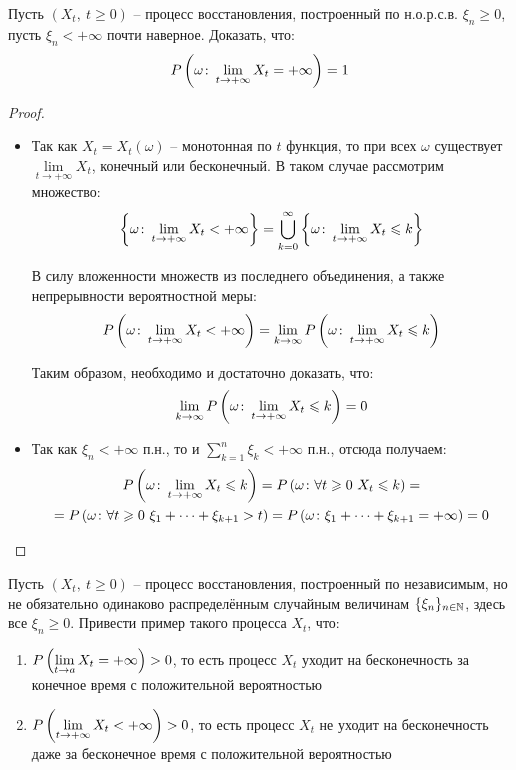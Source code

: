 \begin{problem}
    Пусть $(X_t,\ t \ge 0)$ -- процесс восстановления, построенный по н.о.р.с.в. $\xi_n \ge 0$, пусть $\xi_n < +\infty$ почти наверное. Доказать, что:
    \[
        P\left(\omega \colon \lim_{t \to +\infty} X_t = +\infty\right) = 1
    \]
\end{problem}

\begin{proof}~
    \begin{itemize}
        \item Так как $X_t = X_t(\omega)$ -- монотонная по $t$ функция, то при всех $\omega$ существует $\lim\limits_{t \to +\infty} X_t$, конечный или бесконечный. В таком случае рассмотрим множество:
        \[
            \left\{\omega \colon \lim_{t \to +\infty} X_t < +\infty\right\} = \bigcup_{k=0}^\infty \left\{\omega \colon \lim_{t \to +\infty} X_t \leqslant k\right\}
        \]

        В силу вложенности множеств из последнего объединения, а также непрерывности вероятностной меры:
        \[
            P\left(\omega \colon \lim_{t \to +\infty} X_t < +\infty\right) = \lim_{k \to \infty} P\left(\omega \colon \lim_{t \to +\infty} X_t \leqslant k\right) 
        \]

        Таким образом, необходимо и достаточно доказать, что:
        \[
            \lim_{k \to \infty} P\left(\omega \colon \lim_{t \to +\infty} X_t \leqslant k\right) = 0
        \]

        \item Так как $\xi_n < +\infty$ п.н., то и $\sum\limits_{k=1}^n \xi_k < +\infty$ п.н., отсюда получаем:
        \begin{multline*}
            P\left(\omega \colon \lim_{t \to +\infty} X_t \leqslant k\right) = P\left(\omega \colon \forall t \geqslant 0 \ X_t \leqslant k\right) =
            \\
            = P\left(\omega \colon \forall t \geqslant 0 \ \xi_1 + \dots + \xi_{k+1} > t\right) = P\left(\omega \colon \xi_1 + \dots + \xi_{k+1} = +\infty\right) = 0
        \end{multline*}
    \end{itemize}
\end{proof}

\begin{problem}
    Пусть $(X_t,\ t \ge 0)$ -- процесс восстановления, построенный по независимым, но не обязательно одинаково распределённым случайным величинам $\{\xi_n\}_{n \in \mathbb{N}}$, здесь все $\xi_n \ge 0$. Привести пример такого процесса $X_t$, что:
    \begin{enumerate}
        \item $P\left(\lim\limits_{t \to a} X_t = +\infty\right) > 0$, то есть процесс $X_t$ уходит на бесконечность за конечное время с положительной вероятностью

        \item $P\left(\lim\limits_{t \to +\infty} X_t < +\infty\right) > 0$, то есть процесс $X_t$ не уходит на бесконечность даже за бесконечное время с положительной вероятностью
    \end{enumerate}
\end{problem}

